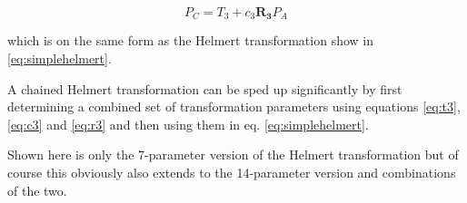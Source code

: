 \documentclass[11pt,twocolumn]{article}
\newcommand{\matr}[1]{\mathbf{#1}}
\begin{document}
\begin{equation}
    P_C = T_3 + c_3 \matr{R_3} P_A
\end{equation}

which is on the same form as the Helmert transformation show in
\ref{eq:simplehelmert}.

A chained Helmert transformation can be sped up significantly by first
determining a combined set of transformation parameters using equations
\ref{eq:t3}, \ref{eq:c3} and \ref{eq:r3} and then using them in eq.
\ref{eq:simplehelmert}.

Shown here is only the 7-parameter version of the Helmert transformation
but of course this obviously also extends to the 14-parameter version and
combinations of the two.
\end{document}

